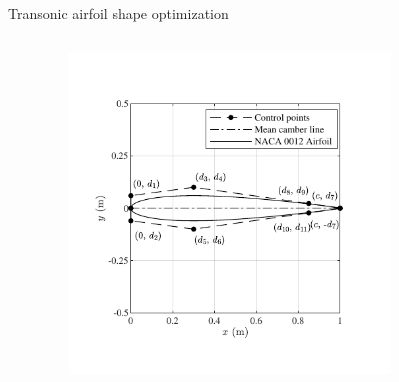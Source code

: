 \documentclass[8pt]{beamer}
\begin{document}
\begin{frame}{Transonic airfoil shape optimization}
\begin{columns}[T]
\begin{column}{0.5\textwidth}
\begin{center}
      \end{center}
    \end{column}
    \begin{column}{0.5\textwidth}
      \begin{center}
        \begin{figure}[H]
        \includegraphics[width=0.8\textwidth]
        {Figures/Fig20-b.pdf}
        \end{figure}
      \end{center}
    \end{column}
  \end{columns}
\end{frame}
\end{document}
